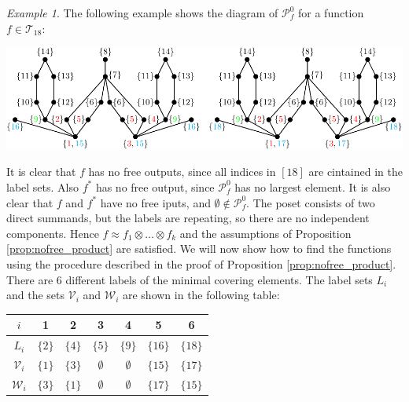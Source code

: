 \documentclass[12pt]{article}
\theoremstyle{definition}
\theoremstyle{remark}
\newtheorem{exm}{Example}
\def\Te{\mathcal T}
\def\Pe{\mathcal P}
\begin{document}
\begin{exm} The following example shows the diagram of $\Pe_f^0$ for a function $f\in
\Te_{18}$:
\begin{center}
\includegraphics[scale=0.9]{product.pdf}
\end{center}
It is clear that $f$ has no free outputs, since all indices in $[18]$ are cintained in the
label sets. Also $f^*$ has no free output, since $\Pe_f^0$ has no largest element. It is
also clear that $f$ and $f^*$ have no free iputs, and $\emptyset\notin \Pe_f^0$.
The poset consists of two direct summands, but the labels are repeating, so there are no
independent components. Hence $f\approx f_1\otimes\dots\otimes f_k$ and the
assumptions of Proposition \ref{prop:nofree_product} are satisfied. We will now show how
to find the functions using the procedure described in the proof of Proposition
\ref{prop:nofree_product}. There are 6 different  labels of the minimal covering elements.
The label sets $L_i$ and the sets
$\mathcal V_i$ and $\mathcal W_i$ are shown in the following table:
\begin{center}
\begin{tabular}{|c|c|c|c|c|c|c|}
\hline
$i$& 1 & 2& 3&4 &5 &6\\
\hline
$L_i$ & $\{2\}$ & $\{4\} $& $\{5\}$ & $\{9\}$ & $\{16\}$ & $\{18\}$\\
\hline
$\mathcal V_i$ & $\{1\}$& $\{3\} $& $\emptyset$ & $ \emptyset$ & $\{15\}$ & $\{17\}$\\
\hline
$\mathcal W_i$& $\{ 3\}$& $\{ 1\} $& $\emptyset$ & $ \emptyset$ & $\{ 17\}$ & $\{15\}$\\
\hline
\end{tabular}


\end{center}
\end{exm}
\end{document}
